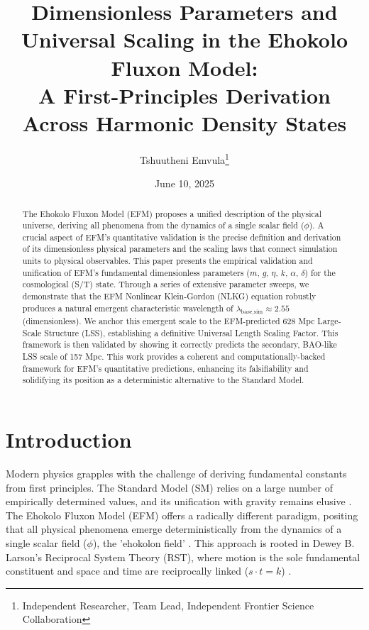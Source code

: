 \documentclass[11pt]{article}
\title{Dimensionless Parameters and Universal Scaling in the Ehokolo Fluxon Model: \\ A First-Principles Derivation Across Harmonic Density States}
\author{Tshuutheni Emvula\thanks{Independent Researcher, Team Lead, Independent Frontier Science Collaboration}}
\date{June 10, 2025}
\begin{document}
\maketitle

\begin{abstract}
The Ehokolo Fluxon Model (EFM) proposes a unified description of the physical universe, deriving all phenomena from the dynamics of a single scalar field (\(\phi\)). A crucial aspect of EFM's quantitative validation is the precise definition and derivation of its dimensionless physical parameters and the scaling laws that connect simulation units to physical observables. This paper presents the empirical validation and unification of EFM's fundamental dimensionless parameters ($m$, $g$, $\eta$, $k$, $\alpha$, $\delta$) for the cosmological (S/T) state. Through a series of extensive parameter sweeps, we demonstrate that the EFM Nonlinear Klein-Gordon (NLKG) equation robustly produces a natural emergent characteristic wavelength of \(\lambda_{\text{base,sim}} \approx 2.55\) (dimensionless). We anchor this emergent scale to the EFM-predicted 628 Mpc Large-Scale Structure (LSS), establishing a definitive Universal Length Scaling Factor. This framework is then validated by showing it correctly predicts the secondary, BAO-like LSS scale of 157 Mpc. This work provides a coherent and computationally-backed framework for EFM's quantitative predictions, enhancing its falsifiability and solidifying its position as a deterministic alternative to the Standard Model.
\end{abstract}

\section{Introduction}
Modern physics grapples with the challenge of deriving fundamental constants from first principles. The Standard Model (SM) relies on a large number of empirically determined values, and its unification with gravity remains elusive \citep{SMReviewPlaceholder}. The Ehokolo Fluxon Model (EFM) offers a radically different paradigm, positing that all physical phenomena emerge deterministically from the dynamics of a single scalar field (\(\phi\)), the 'ehokolon field' \citep{emvula2025compendium_intro,emvula2025efm_foundations}. This approach is rooted in Dewey B. Larson's Reciprocal System Theory (RST), where motion is the sole fundamental constituent and space and time are reciprocally linked ($s \cdot t = k$) \citep{larson1959}.
\end{document}
